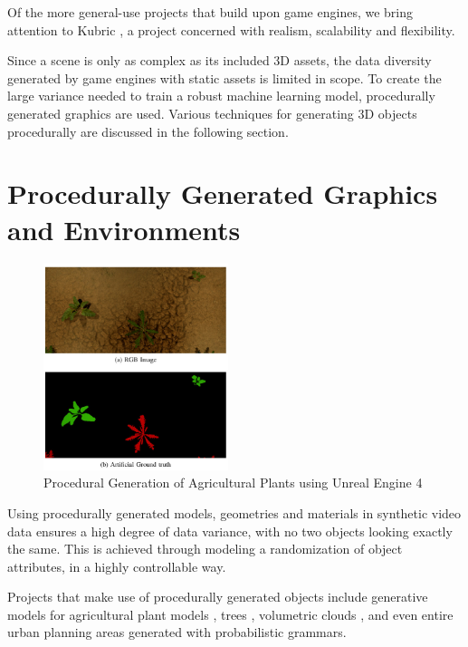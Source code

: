 Of the more general-use projects that build upon game engines, we bring attention to Kubric \cite{greff2021kubric}, a project concerned with realism, scalability and flexibility.

Since a scene is only as complex as its included 3D assets, the data diversity generated by game engines with static assets is limited in scope. To create the large variance needed to train a robust machine learning model, procedurally generated graphics are used. Various techniques for generating 3D objects procedurally are discussed in the following section.

\section{Procedurally Generated Graphics and Environments}
\label{sec:procedurally-generated}


\begin{figure}
    \centering
    \includegraphics[width=0.48\textwidth]{src/img/reated-pics/weeds.jpg}
    \caption{Procedural Generation of Agricultural Plants using Unreal Engine 4 \cite{di2017automatic}}
    \label{fig:relatex-example-weeds}
\end{figure}


Using procedurally generated models, geometries and materials in synthetic video data ensures a high degree of data variance, with no two objects looking exactly the same. This is achieved through modeling a randomization of object attributes, in a highly controllable way.


Projects that make use of procedurally generated objects include generative models for agricultural plant models \cite{di2017automatic,barth2018data}, trees \cite{hewitt2017proceduralTrees}, volumetric clouds \cite{bengtsson2022efficient}, and even entire urban planning areas generated with probabilistic grammars\cite{kar2019meta}.

